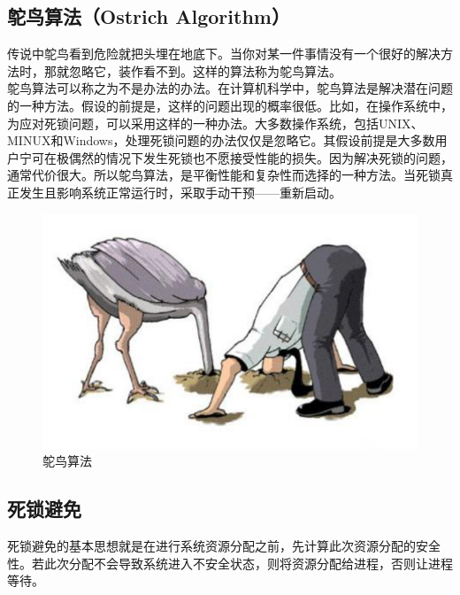 \vspace{0.5cm}

\subsection{鸵鸟算法（Ostrich Algorithm）}

传说中鸵鸟看到危险就把头埋在地底下。当你对某一件事情没有一个很好的解决方法时，那就忽略它，装作看不到。这样的算法称为鸵鸟算法。\\

鸵鸟算法可以称之为不是办法的办法。在计算机科学中，鸵鸟算法是解决潜在问题的一种方法。假设的前提是，这样的问题出现的概率很低。比如，在操作系统中，为应对死锁问题，可以采用这样的一种办法。大多数操作系统，包括UNIX、MINUX和Windows，处理死锁问题的办法仅仅是忽略它。其假设前提是大多数用户宁可在极偶然的情况下发生死锁也不愿接受性能的损失。因为解决死锁的问题，通常代价很大。所以鸵鸟算法，是平衡性能和复杂性而选择的一种方法。当死锁真正发生且影响系统正常运行时，采取手动干预——重新启动。

\begin{figure}[H]
    \centering
    \includegraphics[scale=0.6]{img/C2/2-9/1.png}
    \caption{鸵鸟算法}
\end{figure}

\vspace{0.5cm}

\subsection{死锁避免}

死锁避免的基本思想就是在进行系统资源分配之前，先计算此次资源分配的安全性。若此次分配不会导致系统进入不安全状态，则将资源分配给进程，否则让进程等待。\\

